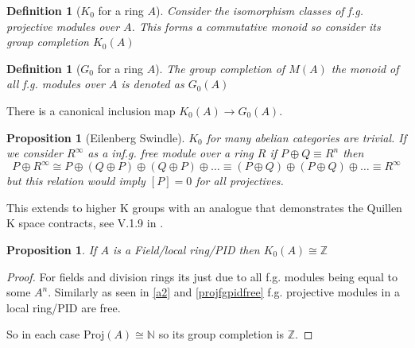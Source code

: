 \documentclass[12pt]{article}
\numberwithin{equation}{section}
\newcommand{\Z}{\mathbb{Z}}
\newcommand{\N}{\mathbb{N}}
\newcounter{dummy} \numberwithin{dummy}{section}
\newtheorem{definition}[dummy]{Definition}
\newtheorem{proposition}[dummy]{Proposition}
\begin{document}
	
	\begin{definition}[$K_0$ for a ring $A$]
		Consider the isomorphism classes of f.g. projective modules over $A$. This forms a commutative monoid so consider its group completion $K_0(A)$
	\end{definition}
	\begin{definition}[$G_0$ for a ring $A$]
	The group completion of $M(A) $ the monoid of all f.g. modules over $A$ is denoted as $G_0(A)$
	\end{definition}
	There is a canonical inclusion map $K_0(A) \to G_0(A)$.

	\begin{proposition}[Eilenberg Swindle]
		$K_0$ for many abelian categories are trivial. If we consider $R^\infty$ as a inf.g. free module over a ring $R$ if $P \oplus Q \equiv R^n$ then \[ P \oplus R^\infty \cong P \oplus (Q \oplus P) \oplus (Q \oplus P) \oplus \dots \equiv (P \oplus Q) \oplus (P \oplus Q) \oplus \dots \equiv R^\infty \] but this relation would imply $[P]=0 $ for all projectives. 
	\end{proposition}
	This extends to higher K groups with an analogue that demonstrates the Quillen K space contracts, see V.1.9 in \cite{weibel2013k}.
	
%	
	\begin{proposition}\label{k0pidisZ}
	If $A$ is a Field/local ring/PID then $K_0(A)\cong\Z$
	\end{proposition}
	\begin{proof}
		For fields and division rings its just due to all f.g. modules being equal to some $A^n$. Similarly as seen in \ref{a2} and \ref{projfgpidfree} f.g. projective modules in a local ring/PID are free.
		
		So in each case $\mathrm{Proj}(A) \cong \N$ so its group completion is $\Z.$
		\end{proof}
		
\end{document}
